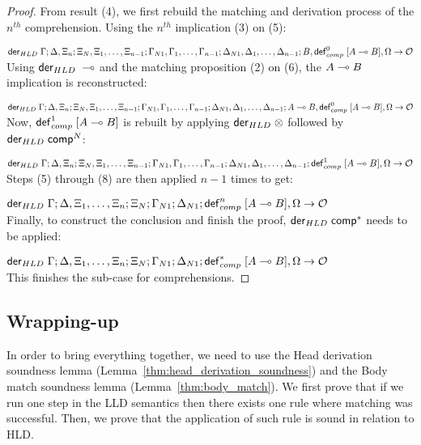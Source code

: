\begin{proof}
\noindent From result (4), we first rebuild the matching and derivation process of the
$n^{th}$ comprehension.  Using the $n^{th}$ implication (3) on (5):

\noindent $\mathsf{der}_{HLD} \; \Gamma; \Delta, \Xi_n; \Xi_N, \Xi_1, \dotsc, \Xi_{n-1}; \Gamma_{N1}, \Gamma_1,
\dotsc, \Gamma_{n-1}; \Delta_{N1}, \Delta_1, \dotsc, \Delta_{n-1}; B, \mathsf{def}_{comp}^{0} \; [A \multimap B],
\Omega \rightarrow \mathcal{O}$ \\

\noindent Using $\mathsf{der}_{HLD} \; \multimap$ and the matching proposition (2) on (6), the $A \multimap B$
implication is reconstructed:

\noindent $\mathsf{der}_{HLD} \; \Gamma; \Delta, \Xi_n; \Xi_N, \Xi_1, \dotsc, \Xi_{n-1}; \Gamma_{N1},
   \Gamma_1, \dotsc, \Gamma_{n-1}; \Delta_{N1}, \Delta_1, \dotsc, \Delta_{n-1};
A \multimap B, \mathsf{def}_{comp}^{0} \; [A \multimap B], \Omega \rightarrow \mathcal{O}$ \\

\noindent Now, $\mathsf{def}_{comp}^{1} \; [A \multimap B]$ is rebuilt by applying $\mathsf{der}_{HLD} \; \otimes$ followed by $\mathsf{der}_{HLD} \;
\mathsf{comp}^N$:

\noindent $\mathsf{der}_{HLD} \; \Gamma; \Delta, \Xi_n; \Xi_N, \Xi_1, \dotsc, \Xi_{n-1}; \Gamma_{N1},
\Gamma_1, \dotsc, \Gamma_{n-1}; \Delta_{N1}, \Delta_1, \dotsc, \Delta_{n-1};
\mathsf{def}_{comp}^{1} \; [A \multimap B], \Omega \rightarrow \mathcal{O}$ \\

\noindent Steps (5) through (8) are then applied $n-1$ times to get:

\noindent $\mathsf{der}_{HLD} \; \Gamma; \Delta, \Xi_1, \dotsc, \Xi_n; \Xi_N; \Gamma_{N1}; \Delta_{N1};
\mathsf{def}_{comp}^{n} \; [A \multimap B], \Omega \rightarrow \mathcal{O}$ \\

\noindent Finally, to construct the conclusion and finish the proof, $\mathsf{der}_{HLD} \; \mathsf{comp}^*$ needs to
be applied:

\noindent $\mathsf{der}_{HLD} \; \Gamma; \Delta, \Xi_1, \dotsc, \Xi_n; \Xi_N; \Gamma_{N1}; \Delta_{N1};
\mathsf{def}_{comp}^{*} \; [A \multimap B], \Omega \rightarrow \mathcal{O}$ \\

\noindent This finishes the sub-case for comprehensions.

\end{proof}

\subsection{Wrapping-up}

In order to bring everything together, we need to use the Head derivation
soundness lemma (Lemma~\ref{thm:head_derivation_soundness}) and the Body match
soundness lemma (Lemma~\ref{thm:body_match}).  We first prove that if we run one
step in the LLD semantics then there exists one rule where matching was
successful. Then, we prove that the application of such rule is sound in
relation to HLD.

